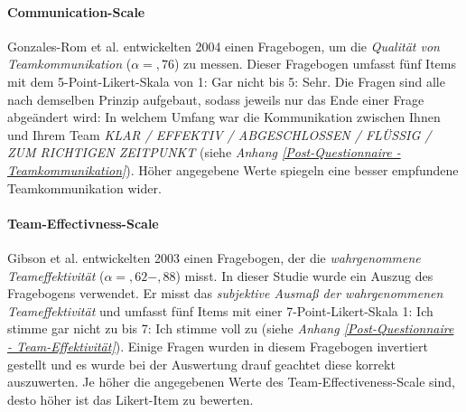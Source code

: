 \documentclass[a4paper,11pt]{article}%
\renewcommand{\\}{\vspace*{0.5\baselineskip} \newline}
\begin{document}
		\paragraph{Communication-Scale}
Gonzales-Rom et al. \citep[S. 1049]{gonzalez2014climate} entwickelten 2004 einen Fragebogen, um die \textit{Qualität von Teamkommunikation} ($\alpha =,76$) zu messen. Dieser Fragebogen umfasst fünf Items mit dem 5-Point-Likert-Skala von 1: \glqq{}Gar nicht\dq{} bis 5: \glqq{}Sehr\dq{}. Die Fragen sind alle nach demselben Prinzip aufgebaut, sodass jeweils nur das Ende einer Frage abgeändert wird: \glqq{}In welchem Umfang war die Kommunikation zwischen Ihnen und Ihrem Team \textit{KLAR / EFFEKTIV / ABGESCHLOSSEN / FLÜSSIG / ZUM RICHTIGEN ZEITPUNKT\dq{}} (siehe \textit{Anhang \ref{Post-Questionnaire - Teamkommunikation}}). Höher angegebene Werte spiegeln eine besser empfundene Teamkommunikation wider.

		\paragraph{Team-Effectivness-Scale}
Gibson et al. \citep[S. 469]{gibson2003team} entwickelten 2003 einen Fragebogen, der die \textit{wahrgenommene Teameffektivität} ($\alpha =,62-,88$) misst. In dieser Studie wurde ein Auszug des Fragebogens verwendet. Er misst das \textit{subjektive Ausmaß der wahrgenommenen Teameffektivität} und umfasst fünf Items mit einer 7-Point-Likert-Skala 1: \glqq{}Ich stimme gar nicht zu\dq{} bis 7: \glqq{}Ich stimme voll zu\dq{} (siehe \textit{Anhang \ref{Post-Questionnaire - Team-Effektivität}}). Einige Fragen wurden in diesem Fragebogen invertiert gestellt und es wurde bei der Auswertung drauf geachtet diese korrekt auszuwerten. Je höher die angegebenen Werte des Team-Effectiveness-Scale sind, desto höher ist das Likert-Item zu bewerten.

\end{document}
